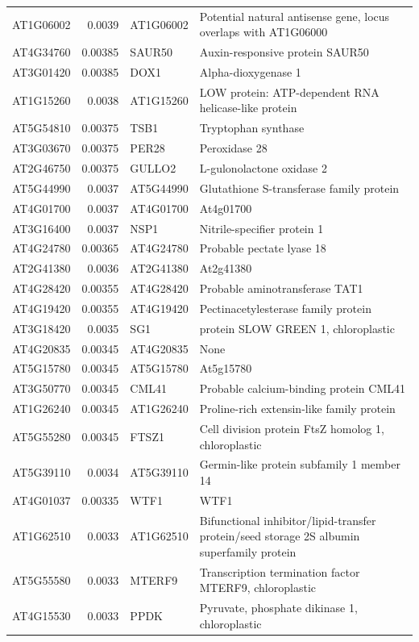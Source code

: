 \documentclass[11pt]{article}
\begin{document}
\begin{center}
\begin{tabular}{lrll}
AT1G06002 & 0.0039 & AT1G06002 & Potential natural antisense gene, locus overlaps with AT1G06000\\
AT4G34760 & 0.00385 & SAUR50 & Auxin-responsive protein SAUR50\\
AT3G01420 & 0.00385 & DOX1 & Alpha-dioxygenase 1\\
AT1G15260 & 0.0038 & AT1G15260 & LOW protein: ATP-dependent RNA helicase-like protein\\
AT5G54810 & 0.00375 & TSB1 & Tryptophan synthase\\
AT3G03670 & 0.00375 & PER28 & Peroxidase 28\\
AT2G46750 & 0.00375 & GULLO2 & L-gulonolactone oxidase 2\\
AT5G44990 & 0.0037 & AT5G44990 & Glutathione S-transferase family protein\\
AT4G01700 & 0.0037 & AT4G01700 & At4g01700\\
AT3G16400 & 0.0037 & NSP1 & Nitrile-specifier protein 1\\
AT4G24780 & 0.00365 & AT4G24780 & Probable pectate lyase 18\\
AT2G41380 & 0.0036 & AT2G41380 & At2g41380\\
AT4G28420 & 0.00355 & AT4G28420 & Probable aminotransferase TAT1\\
AT4G19420 & 0.00355 & AT4G19420 & Pectinacetylesterase family protein\\
AT3G18420 & 0.0035 & SG1 & protein SLOW GREEN 1, chloroplastic\\
AT4G20835 & 0.00345 & AT4G20835 & None\\
AT5G15780 & 0.00345 & AT5G15780 & At5g15780\\
AT3G50770 & 0.00345 & CML41 & Probable calcium-binding protein CML41\\
AT1G26240 & 0.00345 & AT1G26240 & Proline-rich extensin-like family protein\\
AT5G55280 & 0.00345 & FTSZ1 & Cell division protein FtsZ homolog 1, chloroplastic\\
AT5G39110 & 0.0034 & AT5G39110 & Germin-like protein subfamily 1 member 14\\
AT4G01037 & 0.00335 & WTF1 & WTF1\\
AT1G62510 & 0.0033 & AT1G62510 & Bifunctional inhibitor/lipid-transfer protein/seed storage 2S albumin superfamily protein\\
AT5G55580 & 0.0033 & MTERF9 & Transcription termination factor MTERF9, chloroplastic\\
AT4G15530 & 0.0033 & PPDK & Pyruvate, phosphate dikinase 1, chloroplastic\\

\end{tabular}
\end{center}
\end{document}

